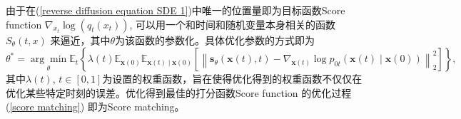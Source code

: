 由于在(\ref{reverse diffusion equation SDE 1})中唯一的位置量即为目标函数Score function $\nabla_{x_t}\log(q_t(x_t))$, 可以用一个和时间和随机变量本身相关的函数$S_{\theta}(t,x)$ 来逼近，其中$\theta$为该函数的参数化。具体优化参数的方式即为
\begin{equation}
{\theta}^*=\underset{{\theta}}{\arg \min } \mathbb{E}_t\left\{\lambda(t) \mathbb{E}_{\mathbf{x}(0)} \mathbb{E}_{\mathbf{x}(t) \mid \mathbf{x}(0)}\left[\left\|\mathbf{s}_{{\theta}}(\mathbf{x}(t), t)-\nabla_{\mathbf{x}(t)} \log p_{0 t}(\mathbf{x}(t) \mid \mathbf{x}(0))\right\|_2^2\right]\right\},
\label{score matching}
\end{equation}
其中$\lambda(t)$, $t\in [0,1]$为设置的权重函数，旨在使得优化得到的权重函数不仅仅在优化某些特定时刻的误差。优化得到最佳的打分函数Score function 的优化过程 (\ref{score matching}) 即为Score matching。    


